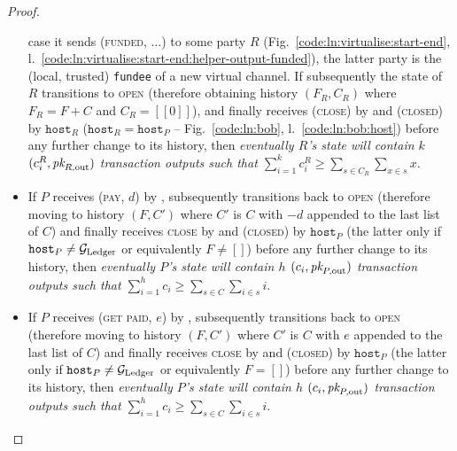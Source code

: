 \begin{proof}
\begin{itemize}
    case it sends (\textsc{funded}, $\dots$) to some party $R$
    (Fig.~\ref{code:ln:virtualise:start-end},
    l.~\ref{code:ln:virtualise:start-end:helper-output-funded}), the latter
    party is the (local, trusted) \texttt{fundee} of a new virtual channel. If
    subsequently the state of $R$ transitions to \textsc{open} (therefore
    obtaining history $(F_R, C_R)$ where $F_R = F + C$ and $C_R = [[0]]$), and
    finally receives (\textsc{close}) by \environment and (\textsc{closed}) by
    $\texttt{host}_R$ ($\texttt{host}_R = \texttt{host}_P$ --
    Fig.~\ref{code:ln:bob}, l.~\ref{code:ln:bob:host}) before any further change
    to its history, then \emph{eventually $R$'s \ledger state will contain $k$
    $(c^R_i, \textit{pk}_{R, \mathrm{out}})$ transaction outputs such that
    $\sum\limits_{i=1}^k c^R_i \geq \sum\limits_{s \in C_R} \sum\limits_{x \in
    s} x$}.
    \item If $P$ receives (\textsc{pay}, $d$) by \environment, subsequently
    transitions back to \textsc{open} (therefore moving to history $(F, C')$
    where $C'$ is $C$ with $-d$ appended to the last list of $C$) and finally
    receives \textsc{close} by \environment and (\textsc{closed}) by
    $\texttt{host}_P$ (the latter only if $\texttt{host}_P \neq \mathcal{G}_{\mathrm{Ledger}}$ or
    equivalently $F \neq []$) before any further change to its history, then
    \emph{eventually $P$'s \ledger state will contain $h$ $(c_i, \textit{pk}_{P,
    \mathrm{out}})$ transaction outputs such that $\sum\limits_{i=1}^h c_i \geq
    \sum\limits_{s \in C} \sum\limits_{i \in s} i$}.
    \item If $P$ receives (\textsc{get paid}, $e$) by \environment, subsequently
    transitions back to \textsc{open} (therefore moving to history $(F, C')$
    where $C'$ is $C$ with $e$ appended to the last list of $C$) and finally
    receives \textsc{close} by \environment and (\textsc{closed}) by
    $\texttt{host}_P$ (the latter only if $\texttt{host}_P \neq \mathcal{G}_{\mathrm{Ledger}}$ or
    equivalently $F = []$) before any further change to its history, then
    \emph{eventually $P$'s \ledger state will contain $h$ $(c_i, \textit{pk}_{P,
    \mathrm{out}})$ transaction outputs such that $\sum\limits_{i=1}^h c_i \geq
    \sum\limits_{s \in C} \sum\limits_{i \in s} i$}.
  \end{itemize}


\end{proof}
